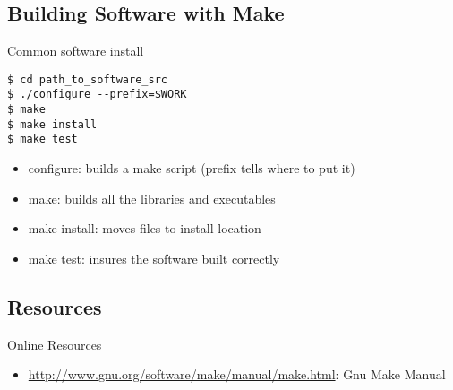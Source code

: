 \documentclass{beamer}
\begin{document}
\subsection{Building Software with Make}
\lstset{language=bash}
\begin{frame}[fragile]
\begin{block}{Common software install}
\begin{lstlisting}
$ cd path_to_software_src
$ ./configure --prefix=$WORK
$ make
$ make install
$ make test
\end{lstlisting}
\end{block}
\begin{itemize}
\item configure: builds a make script (prefix tells where to put it)
\item make: builds all the libraries and executables
\item make install: moves files to install location
\item make test: insures the software built correctly
\end{itemize}
\end{frame}

\subsection{Resources}
\begin{frame}
\begin{block}{Online Resources}
  \begin{itemize}
  \item \url{http://www.gnu.org/software/make/manual/make.html}: Gnu Make Manual
    \end{itemize}
\end{block}

\end{frame}
\end{document}
